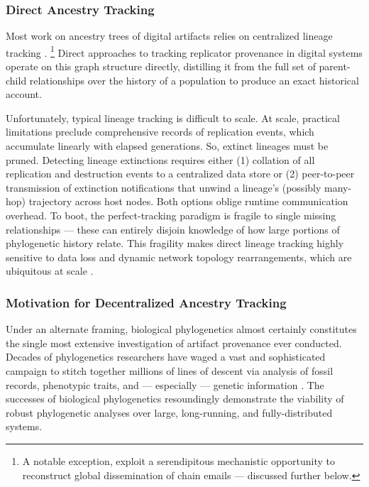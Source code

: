 \subsubsection{Direct Ancestry Tracking}

Most work on ancestry trees of digital artifacts relies on centralized lineage tracking \citep{friggeri2014rumor,cohen1987computer,dolson2024phylotrack}.%
\footnote{A notable exception, \cite{libennowell2008tracing} exploit a serendipitous mechanistic opportunity to reconstruct global dissemination of chain emails --- discussed further below.}
Direct approaches to tracking replicator provenance in digital systems operate on this graph structure directly, distilling it from the full set of parent-child relationships over the history of a population to produce an exact historical account.

Unfortunately, typical lineage tracking is difficult to scale.
At scale, practical limitations preclude comprehensive records of replication events, which accumulate linearly with elapsed generations.
So, extinct lineages must be pruned.
Detecting lineage extinctions requires either (1) collation of all replication and destruction events to a centralized data store or (2) peer-to-peer transmission of extinction notifications that unwind a lineage's (possibly many-hop) trajectory across host nodes.
Both options oblige runtime communication overhead.
To boot, the perfect-tracking paradigm is fragile to single missing relationships --- these can entirely disjoin knowledge of how large portions of phylogenetic history relate.
This fragility makes direct lineage tracking highly sensitive to data loss and dynamic network topology rearrangements, which are ubiquitous at scale \citep{cappello2014toward,ackley2011pursue}.

\subsubsection{Motivation for Decentralized Ancestry Tracking}

Under an alternate framing, biological phylogenetics almost certainly constitutes the single most extensive investigation of artifact provenance ever conducted.
Decades of phylogenetics researchers have waged a vast and sophisticated campaign to stitch together millions of lines of descent via analysis of fossil records, phenotypic traits, and --- especially --- genetic information \citep{hinchliff2015synthesis,lee2015morphological}.
The successes of biological phylogenetics resoundingly demonstrate the viability of robust phylogenetic analyses over large, long-running, and fully-distributed systems.

